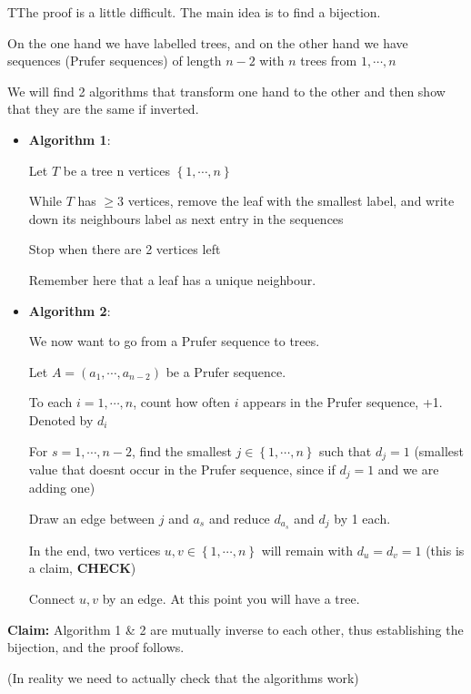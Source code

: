 \begin{prf}
  TThe proof is a little difficult. The main idea is to find a bijection.
  \par\bigskip
  \noindent On the one hand we have labelled trees, and on the other hand we have sequences (Prufer sequences) of length $n-2$ with $n$ trees from $1,\cdots,n$ 
  \par\bigskip
  \noindent We will find 2 algorithms that transform one hand to the other and then show that they are the same if inverted.
  \par\bigskip
  \begin{itemize}
    \item \textbf{Algorithm 1}:\par
    Let $T$ be a tree n vertices $\left\{1,\cdots,n\right\}$\par
    While $T$ has $\geq3$ vertices, remove the leaf with the smallest label, and write down its neighbours label as next entry in the sequences\par
    Stop when there are 2 vertices left\par
    Remember here that a leaf has a unique neighbour.
    \par\bigskip
  \item\textbf{Algorithm 2}:\par
    We now want to go from a Prufer sequence to trees.\par
    Let $A = (a_1,\cdots,a_{n-2})$ be a Prufer sequence.\par
    To each $i = 1,\cdots, n$, count how often $i$ appears in the Prufer sequence, +1. Denoted by $d_i$\par
  For $s=1,\cdots,n-2$, find the smallest $j\in\left\{1,\cdots,n\right\}$ such that $d_j=1$ (smallest value that doesnt occur in the Prufer sequence, since if $d_j=1$ and we are adding one)\par
  Draw an edge between $j$ and $a_s$ and reduce $d_{a_s}$ and $d_j$ by 1 each.\par
  In the end, two vertices $u,v\in\left\{1,\cdots,n\right\}$ will remain with $d_u=d_v=1$ (this is a claim, \textbf{CHECK})\par
  Connect $u,v$ by an edge. At this point you will have a tree. 
  \end{itemize}
  \par\bigskip
  \noindent\textbf{Claim:} Algorithm 1 \& 2 are mutually inverse to each other, thus establishing the bijection, and the proof follows.\par
  \noindent (In reality we need to actually check that the algorithms work)
\end{prf}
